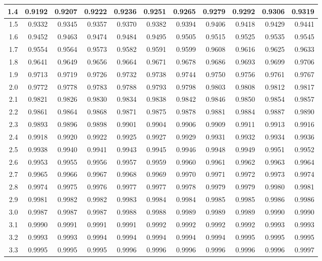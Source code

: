 \documentclass[10pt]{article}
\begin{document}
\begin{center}
\begin{tabular}{|r|r@{\ }r@{\ }r@{\ }r@{\ }r@{\ }r@{\ }r@{\ }r@{\ }r@{\ }r@{\ }|}
    \hline
    1.4&0.9192&0.9207&0.9222&0.9236&0.9251&0.9265&0.9279&0.9292&0.9306&0.9319\\
    \hline
    1.5&0.9332&0.9345&0.9357&0.9370&0.9382&0.9394&0.9406&0.9418&0.9429&0.9441\\
    \hline
    1.6&0.9452&0.9463&0.9474&0.9484&0.9495&0.9505&0.9515&0.9525&0.9535&0.9545\\
    \hline
    1.7&0.9554&0.9564&0.9573&0.9582&0.9591&0.9599&0.9608&0.9616&0.9625&0.9633\\
    \hline
    1.8&0.9641&0.9649&0.9656&0.9664&0.9671&0.9678&0.9686&0.9693&0.9699&0.9706\\
    \hline
    1.9&0.9713&0.9719&0.9726&0.9732&0.9738&0.9744&0.9750&0.9756&0.9761&0.9767\\
    \hline
    2.0&0.9772&0.9778&0.9783&0.9788&0.9793&0.9798&0.9803&0.9808&0.9812&0.9817\\
    \hline
    2.1&0.9821&0.9826&0.9830&0.9834&0.9838&0.9842&0.9846&0.9850&0.9854&0.9857\\
    \hline
    2.2&0.9861&0.9864&0.9868&0.9871&0.9875&0.9878&0.9881&0.9884&0.9887&0.9890\\
    \hline
    2.3&0.9893&0.9896&0.9898&0.9901&0.9904&0.9906&0.9909&0.9911&0.9913&0.9916\\
    \hline
    2.4&0.9918&0.9920&0.9922&0.9925&0.9927&0.9929&0.9931&0.9932&0.9934&0.9936\\
    \hline
    2.5&0.9938&0.9940&0.9941&0.9943&0.9945&0.9946&0.9948&0.9949&0.9951&0.9952\\
    \hline
    2.6&0.9953&0.9955&0.9956&0.9957&0.9959&0.9960&0.9961&0.9962&0.9963&0.9964\\
    \hline
    2.7&0.9965&0.9966&0.9967&0.9968&0.9969&0.9970&0.9971&0.9972&0.9973&0.9974\\
    \hline
    2.8&0.9974&0.9975&0.9976&0.9977&0.9977&0.9978&0.9979&0.9979&0.9980&0.9981\\
    \hline
    2.9&0.9981&0.9982&0.9982&0.9983&0.9984&0.9984&0.9985&0.9985&0.9986&0.9986\\
    \hline
    3.0&0.9987&0.9987&0.9987&0.9988&0.9988&0.9989&0.9989&0.9989&0.9990&0.9990\\
    \hline
    3.1&0.9990&0.9991&0.9991&0.9991&0.9992&0.9992&0.9992&0.9992&0.9993&0.9993\\
    \hline
    3.2&0.9993&0.9993&0.9994&0.9994&0.9994&0.9994&0.9994&0.9995&0.9995&0.9995\\
    \hline
    3.3&0.9995&0.9995&0.9995&0.9996&0.9996&0.9996&0.9996&0.9996&0.9996&0.9997\\

\end{tabular}
\end{center}
\end{document}
